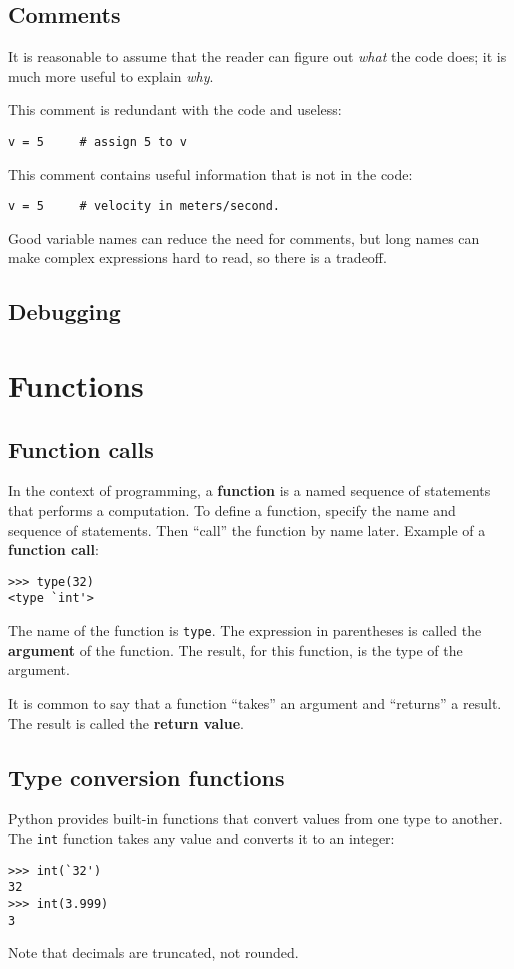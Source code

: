 \documentclass{article}
\begin{document}
\subsection{Comments}
It is reasonable to assume that the reader can figure out
\emph{what} the code does; it is much more useful to explain
\emph{why}.

This comment is redundant with the code and useless:
\begin{verbatim}
v = 5     # assign 5 to v
\end{verbatim}
This comment contains useful information that is not in the code:
\begin{verbatim}
v = 5     # velocity in meters/second.
\end{verbatim}
Good variable names can reduce the need for comments, but long names
can make complex expressions hard to read, so there is a tradeoff.

\subsection{Debugging}

\section{Functions}
\subsection{Function calls}
In the context of programming, a \textbf{function} is a named
sequence of statements that performs a computation.
To define a function, specify the name and sequence of
statements. Then ``call'' the function by name later.
Example of a \textbf{function call}:
\begin{verbatim}
>>> type(32)
<type `int'>
\end{verbatim}
The name of the function is \verb|type|. The expression in
parentheses is called the \textbf{argument} of the function.
The result, for this function, is the type of the argument.

It is common to say that a function ``takes'' an argument and
``returns'' a result. The result is called the \textbf{return value}.
\subsection{Type conversion functions}
Python provides built-in functions that convert values from
one type to another. The \verb|int| function takes any value
and converts it to an integer:
\begin{verbatim}
>>> int(`32')
32
>>> int(3.999)
3
\end{verbatim}
Note that decimals are truncated, not rounded.
\end{document}
